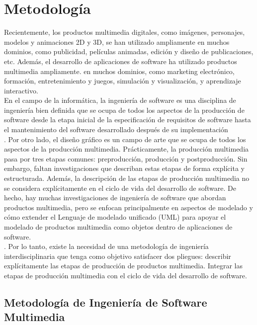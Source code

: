 \section{Metodología}
Recientemente, los productos multimedia digitales, como imágenes, personajes, modelos y animaciones 2D y 3D, se han utilizado ampliamente en muchos dominios, como publicidad, 
películas animadas, edición y diseño de publicaciones, etc. Además, el desarrollo de aplicaciones de software ha utilizado productos multimedia ampliamente. en muchos dominios, 
como marketing electrónico, formación, entretenimiento y juegos, simulación y visualización, y aprendizaje interactivo.\\
En el campo de la informática, la ingeniería de software es una disciplina de ingeniería bien definida que se ocupa de todos los aspectos de la producción de software desde la 
etapa inicial de la especificación de requisitos de software hasta el mantenimiento del software desarrollado después de su implementación \\.
 Por otro lado, el diseño gráfico es un campo de arte que se ocupa de todos los aspectos de la producción multimedia. Prácticamente, la producción multimedia pasa por tres 
 etapas comunes: preproducción, producción y postproducción. Sin embargo, faltan investigaciones que describan estas etapas de forma explícita y estructurada. Además, la 
 descripción de las etapas de producción multimedia no se considera explícitamente en el ciclo de vida del desarrollo de software. De hecho, hay muchas investigaciones de 
 ingeniería de software que abordan productos multimedia, pero se enfocan principalmente en aspectos de modelado y cómo extender el Lenguaje de modelado unificado (UML) 
 para apoyar el modelado de productos multimedia como objetos dentro de aplicaciones de software. \\.
Por lo tanto, existe la necesidad de una metodología de ingeniería interdisciplinaria que tenga como objetivo satisfacer dos pliegues: describir explícitamente las etapas 
de producción de productos multimedia. Integrar las etapas de producción multimedia con el ciclo de vida del desarrollo de software.\cite{al2019multimedia}

\subsection{Metodología de Ingeniería de Software Multimedia}

